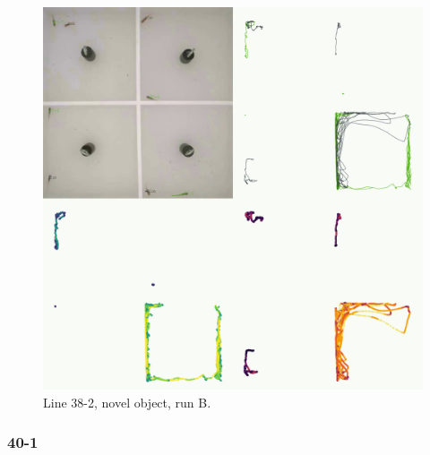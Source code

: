 \documentclass[
]{book}
\begin{document}
\begin{figure}
\includegraphics[width=1\linewidth]{figs/mikk_behaviour/four_panel_plots/novel_object_20191116_1309_21-2_R_B_300} \caption{Line 38-2, novel object, run B.}\label{fig:4p-21-2-no-B}
\end{figure}

\hypertarget{section-12}{%
\subsubsection{40-1}\label{section-12}}
\end{document}
